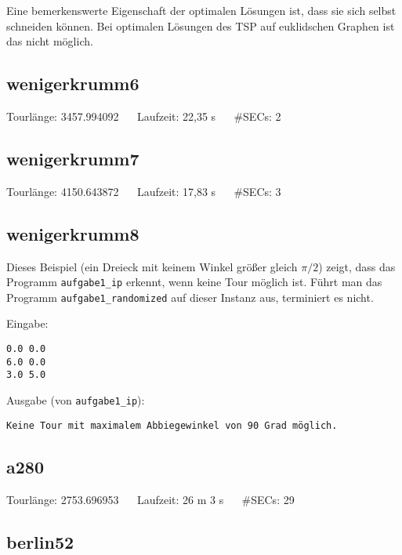 \documentclass[a4paper, 10pt, ngerman]{article}
\begin{document}
\noindent Eine bemerkenswerte Eigenschaft der optimalen Lösungen ist, dass sie sich selbst schneiden können. Bei optimalen Lösungen des TSP auf euklidschen Graphen ist das nicht möglich. 

\subsection{wenigerkrumm6}



\noindent Tourlänge: 3457.994092 $\quad$ Laufzeit: 22,35 s $\quad$ \#SECs: 2

\subsection{wenigerkrumm7}



\noindent Tourlänge: 4150.643872 $\quad$ Laufzeit: 17,83 s $\quad$ \#SECs: 3

\subsection{wenigerkrumm8}

Dieses Beispiel (ein Dreieck mit keinem Winkel größer gleich $\pi / 2$) zeigt, dass das Programm \verb|aufgabe1_ip| erkennt, wenn keine Tour möglich ist. Führt man das Programm \verb|aufgabe1_randomized| auf dieser Instanz aus, terminiert es nicht.
\medskip

\noindent Eingabe:
\begin{verbatim}
0.0 0.0
6.0 0.0
3.0 5.0
\end{verbatim}

\noindent Ausgabe (von \verb|aufgabe1_ip|):
\begin{verbatim}
Keine Tour mit maximalem Abbiegewinkel von 90 Grad möglich.
\end{verbatim}

\subsection{a280}



\noindent Tourlänge: 2753.696953 $\quad$ Laufzeit: 26 m 3 s $\quad$ \#SECs: 29

\subsection{berlin52}
\end{document}
